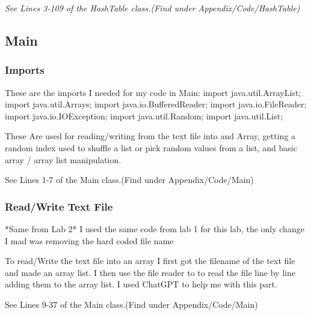 \documentclass[10pt]{article}
\begin{document}
\newline

\emph{\normalfont
See Lines 3-109 of the HashTable class.(Find under Appendix/Code/HashTable)}

\subsection{Main}\label{operations}

\subsubsection{Imports}

These are the imports I needed for my code in Main:
\newline
import java.util.ArrayList;
\newline
import java.util.Arrays;
\newline
import java.io.BufferedReader;
\newline
import java.io.FileReader;
\newline
import java.io.IOException;
\newline
import java.util.Random;
\newline
import java.util.List;


These Are used for reading/writing from the text file into and Array, getting a random index used to shuffle a list or pick random values from a list, and basic array / array list manipulation.

See Lines 1-7 of the Main class.(Find under Appendix/Code/Main)

\subsubsection{Read/Write Text File}
*Same from Lab 2*
\newline
I used the same code from lab 1 for this lab, the only change I mad was removing the hard coded file name

To read/Write the text file into an array I first got the filename of the text file and made an array list. I then use the file reader to to read the file line by line adding them to the array list. I used ChatGPT to help me with this part.

See Lines 9-37 of the Main class.(Find under Appendix/Code/Main)
\end{document}
